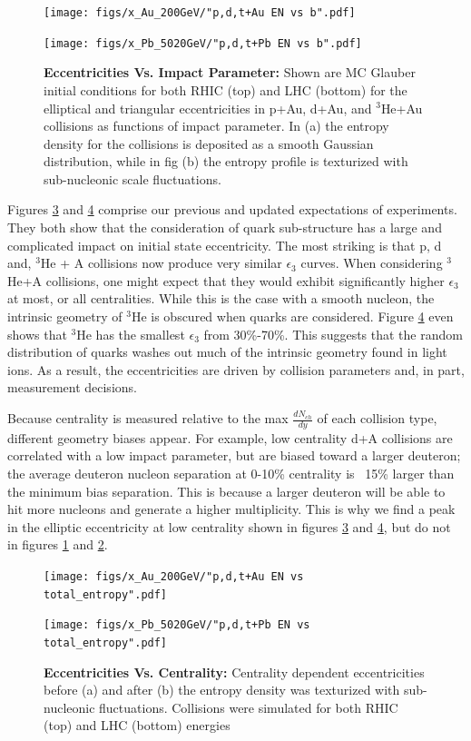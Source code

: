 \documentclass[twocolumn,showpacs,amsfonts,aps,prc,nofootinbib,floatfix]{revtex4}
\begin{document}
\begin{figure}[ht]
	\centering
	\texttt{[image: figs/x\_Au\_200GeV/"p,d,t+Au EN vs b".pdf]}
	\caption{}
	\label{fig:AuENvsB}
\end{figure}
\begin{figure}
	\centering
	\texttt{[image: figs/x\_Pb\_5020GeV/"p,d,t+Pb EN vs b".pdf]}
    \caption{\textbf{Eccentricities Vs. Impact Parameter:}  Shown are MC Glauber initial conditions for both RHIC (top) and LHC (bottom) for the elliptical and triangular eccentricities in p+Au, d+Au, and $^3$He+Au collisions as functions of impact parameter. In  (a) the entropy density for the collisions is deposited as a smooth Gaussian distribution, while in fig (b) the entropy profile is texturized with sub-nucleonic scale fluctuations. }
    \label{fig:PbENvsB}
\end{figure}
Figures \ref{fig:AuENvsCent} and \ref{fig:PbENvsCent} comprise our previous and updated expectations of experiments. They both show that the consideration of quark sub-structure has a large and complicated impact on initial state eccentricity. The most striking is that p, d and, $^3$He + A collisions now produce very similar $\epsilon_3$ curves. When considering $^3$He+A collisions, one might expect that they would exhibit significantly higher $\epsilon_3$ at most, or all centralities. While this is the case with a smooth nucleon, the intrinsic geometry of $^3$He is obscured when quarks are considered. Figure \ref{fig:PbENvsCent} even shows that $^3$He has the smallest $\epsilon_3$ from 30\%-70\%. This suggests that the random distribution of quarks washes out much of the intrinsic geometry found in light ions. As a result, the eccentricities are driven by collision parameters and, in part, measurement decisions.

Because centrality is measured relative to the max $\frac{dN_{ch}}{dy}$ of each collision type, different geometry biases appear. For example, low centrality d+A collisions are correlated with a low impact parameter, but are biased toward a larger deuteron; the average deuteron nucleon separation at 0-10\% centrality is ~15\% larger than the minimum bias separation. This is because a larger deuteron will be able to hit more nucleons and generate a higher multiplicity. This is why we find a peak in the elliptic eccentricity at low centrality shown in figures \ref{fig:AuENvsCent} and \ref{fig:PbENvsCent}, but do not in figures \ref{fig:AuENvsB} and \ref{fig:PbENvsB}.
\begin{figure}[ht]
	\centering
	\texttt{[image: figs/x\_Au\_200GeV/"p,d,t+Au EN vs total\_entropy".pdf]}
	\caption{}
	\label{fig:AuENvsCent}
\end{figure} 
\begin{figure}[ht]
	\centering
	\texttt{[image: figs/x\_Pb\_5020GeV/"p,d,t+Pb EN vs total\_entropy".pdf]}
	\caption{\textbf{Eccentricities Vs. Centrality:} Centrality dependent eccentricities before (a) and after (b) the entropy density was texturized with sub-nucleonic fluctuations. Collisions were simulated for both RHIC (top) and LHC (bottom) energies}
	\label{fig:PbENvsCent}
\end{figure}
\end{document}
